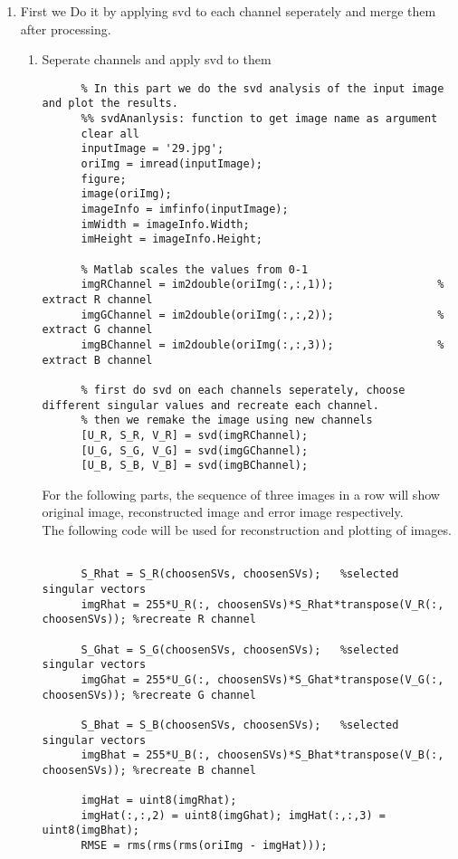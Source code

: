 \documentclass{article}
\begin{document}
\begin{enumerate}
  \item First we Do it by applying svd to each channel seperately and merge them after processing.
  \begin{enumerate}
    \item Seperate channels and apply svd to them\\
    \begin{lstlisting}
      % In this part we do the svd analysis of the input image and plot the results.
      %% svdAnanlysis: function to get image name as argument
      clear all
      inputImage = '29.jpg';
      oriImg = imread(inputImage);
      figure;
      image(oriImg);
      imageInfo = imfinfo(inputImage);
      imWidth = imageInfo.Width;
      imHeight = imageInfo.Height;

      % Matlab scales the values from 0-1
      imgRChannel = im2double(oriImg(:,:,1));                % extract R channel
      imgGChannel = im2double(oriImg(:,:,2));                % extract G channel
      imgBChannel = im2double(oriImg(:,:,3));                % extract B channel

      % first do svd on each channels seperately, choose different singular values and recreate each channel.
      % then we remake the image using new channels
      [U_R, S_R, V_R] = svd(imgRChannel);
      [U_G, S_G, V_G] = svd(imgGChannel);
      [U_B, S_B, V_B] = svd(imgBChannel);
    \end{lstlisting}
    \newpage
    For the following parts, the sequence of three images in a row will show original image, reconstructed image and error image respectively.\\
    The following code will be used for reconstruction and plotting of images.
    \begin{lstlisting}
            
      S_Rhat = S_R(choosenSVs, choosenSVs);   %selected singular vectors
      imgRhat = 255*U_R(:, choosenSVs)*S_Rhat*transpose(V_R(:, choosenSVs)); %recreate R channel

      S_Ghat = S_G(choosenSVs, choosenSVs);   %selected singular vectors
      imgGhat = 255*U_G(:, choosenSVs)*S_Ghat*transpose(V_G(:, choosenSVs)); %recreate G channel

      S_Bhat = S_B(choosenSVs, choosenSVs);   %selected singular vectors
      imgBhat = 255*U_B(:, choosenSVs)*S_Bhat*transpose(V_B(:, choosenSVs)); %recreate B channel

      imgHat = uint8(imgRhat);
      imgHat(:,:,2) = uint8(imgGhat); imgHat(:,:,3) = uint8(imgBhat);
      RMSE = rms(rms(rms(oriImg - imgHat)));


\end{lstlisting}
\end{enumerate}
\end{enumerate}
\end{document}
